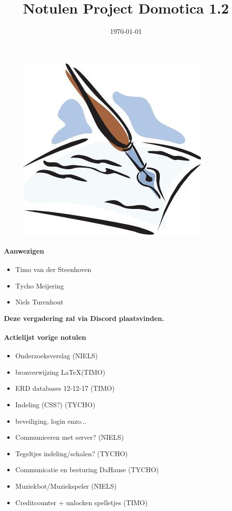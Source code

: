 \documentclass[11pt]{article}
\title{Notulen Project Domotica 1.2}
\date{\today} %
\begin{document}
\thispagestyle{empty}
\maketitle %
\begin{figure}[h]
	\includegraphics[width=\textwidth]{notulen}
	\date{} %
\end{figure}
\newpage
\paragraph{Aanwezigen}
\begin{itemize}
	\item Timo van der Steenhoven
	\item Tycho Meijering
	\item Niels Turenhout
\end{itemize}
\textbf{Deze vergadering zal via Discord plaatsvinden.}
\paragraph{Actielijst vorige notulen}
\begin{itemize}
\item Onderzoeksverslag (NIELS)
\item bronverwijzing \LaTeX (TIMO)
\item ERD databases 12-12-17 (TIMO)
\item Indeling (CSS?) (TYCHO)
\item beveiliging, login enzo... 
\item Communiceren met server? (NIELS)
\item Tegeltjes indeling/schalen? (TYCHO)
\item Communicatie en besturing DaHause (TYCHO)
\item Muziekbot/Muziekspeler (NIELS)
\item Creditcounter + unlocken spelletjes (TIMO)
\end{itemize}
\end{document}
